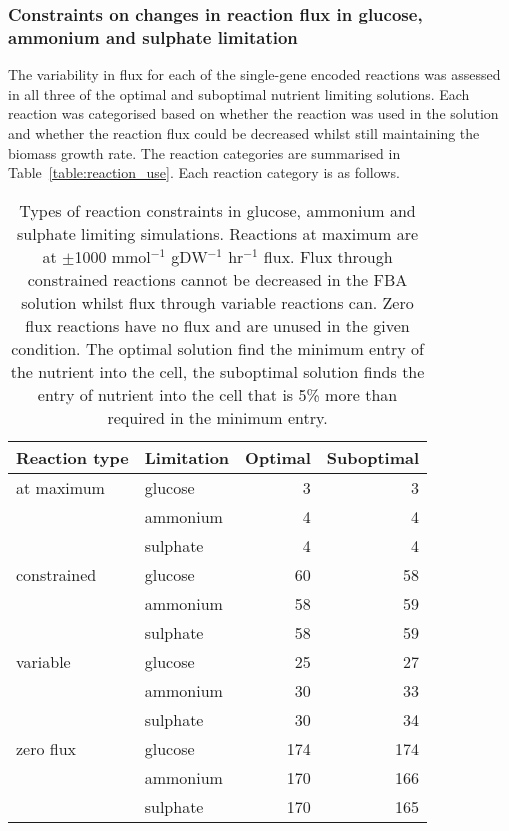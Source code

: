 
\subsubsection{Constraints on changes in reaction flux in glucose, ammonium  and sulphate limitation}%

The variability in flux for each of the single-gene encoded reactions was assessed in all three of the optimal and suboptimal nutrient limiting solutions. Each reaction was categorised based on whether the reaction was used in the solution and whether the reaction flux could be decreased whilst still maintaining the biomass growth rate. The reaction categories are summarised in Table~\vref{table:reaction_use}. Each reaction category is as follows.

\begin{table}%
  \centering
  \begin{tabular}{l l r r}
                                                         \toprule
    Reaction type & Limitation & Optimal & Suboptimal \\ \midrule
    at maximum    & glucose    &       3 &          3 \\
                  & ammonium   &       4 &          4 \\
                  & sulphate   &       4 &          4 \\
    constrained   & glucose    &      60 &         58 \\
                  & ammonium   &      58 &         59 \\
                  & sulphate   &      58 &         59 \\
    variable      & glucose    &      25 &         27 \\
                  & ammonium   &      30 &         33 \\
                  & sulphate   &      30 &         34 \\
    zero flux     & glucose    &     174 &        174 \\
                  & ammonium   &     170 &        166 \\
                  & sulphate   &     170 &        165 \\ \bottomrule
  \end{tabular}
  \caption[Types of reaction constraints in glucose, ammonium and sulphate limitation]{Types of reaction constraints in glucose, ammonium and sulphate limiting simulations. Reactions at maximum are at $\pm$1000 mmol$^{-1}$ gDW$^{-1}$ hr$^{-1}$ flux. Flux through constrained reactions cannot be decreased in the FBA solution whilst flux through variable reactions can. Zero flux reactions have no flux and are unused in the given condition. The optimal solution find the minimum entry of the nutrient into the cell, the suboptimal solution finds the entry of nutrient into the cell that is 5\% more than required in the minimum entry. }
  \label{table:reaction_use}
\end{table}%

